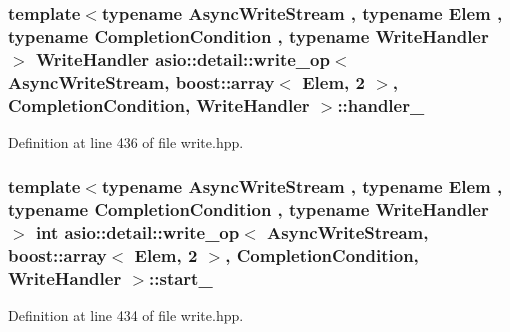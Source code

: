 \subsubsection[{handler\+\_\+}]{\setlength{\rightskip}{0pt plus 5cm}template$<$typename Async\+Write\+Stream , typename Elem , typename Completion\+Condition , typename Write\+Handler $>$ Write\+Handler {\bf asio\+::detail\+::write\+\_\+op}$<$ Async\+Write\+Stream, {\bf boost\+::array}$<$ Elem, 2 $>$,                           Completion\+Condition, Write\+Handler $>$\+::handler\+\_\+}\label{classasio_1_1detail_1_1write__op_3_01_async_write_stream_00_01boost_1_1array_3_01_elem_00_012_018cbe26fbc46920cd28943bf9ace97230_a3edc5e252ebfa57323e6dafc60dc724d}


Definition at line 436 of file write.\+hpp.

\hypertarget{classasio_1_1detail_1_1write__op_3_01_async_write_stream_00_01boost_1_1array_3_01_elem_00_012_018cbe26fbc46920cd28943bf9ace97230_a352127ccede68061fa205c9760ed9c98}{}
\subsubsection[{start\+\_\+}]{\setlength{\rightskip}{0pt plus 5cm}template$<$typename Async\+Write\+Stream , typename Elem , typename Completion\+Condition , typename Write\+Handler $>$ int {\bf asio\+::detail\+::write\+\_\+op}$<$ Async\+Write\+Stream, {\bf boost\+::array}$<$ Elem, 2 $>$,                           Completion\+Condition, Write\+Handler $>$\+::start\+\_\+}\label{classasio_1_1detail_1_1write__op_3_01_async_write_stream_00_01boost_1_1array_3_01_elem_00_012_018cbe26fbc46920cd28943bf9ace97230_a352127ccede68061fa205c9760ed9c98}


Definition at line 434 of file write.\+hpp.

